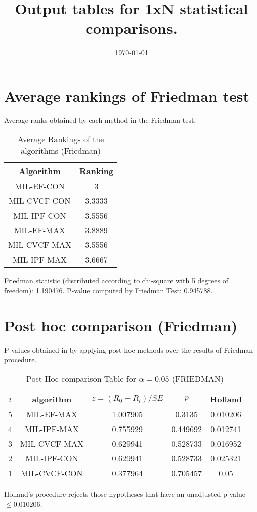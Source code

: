 \documentclass[a4paper,10pt]{article}
\title{Output tables for 1xN statistical comparisons.}
\author{}
\date{\today}
\begin{document}
\begin{landscape}
\pagestyle{empty}
\maketitle
\thispagestyle{empty}

\section{Average rankings of Friedman test}


Average ranks obtained by each method in the Friedman test.

\begin{table}[!htp]
\centering
\begin{tabular}{|c|c|}\hline
Algorithm&Ranking\\\hline
MIL-EF-CON&3\\MIL-CVCF-CON&3.3333\\MIL-IPF-CON&3.5556\\MIL-EF-MAX&3.8889\\MIL-CVCF-MAX&3.5556\\MIL-IPF-MAX&3.6667\\\hline\end{tabular}
\caption{Average Rankings of the algorithms (Friedman)}
\end{table}

Friedman statistic (distributed according to chi-square with 5 degrees of freedom): 1.190476. \newline P-value computed by Friedman Test: 0.945788.\newline


\newpage

\section{Post hoc comparison (Friedman)}


P-values obtained in by applying post hoc methods over the results of Friedman procedure.

\begin{table}[!htp]
\centering\footnotesize
\begin{tabular}{ccccc}
$i$&algorithm&$z=(R_0 - R_i)/SE$&$p$&Holland\\
\hline5&MIL-EF-MAX&1.007905&0.3135&0.010206\\4&MIL-IPF-MAX&0.755929&0.449692&0.012741\\3&MIL-CVCF-MAX&0.629941&0.528733&0.016952\\2&MIL-IPF-CON&0.629941&0.528733&0.025321\\1&MIL-CVCF-CON&0.377964&0.705457&0.05\\\hline
\end{tabular}
\caption{Post Hoc comparison Table for $\alpha=0.05$ (FRIEDMAN)}
\end{table}Holland's procedure rejects those hypotheses that have an unadjusted p-value $\le0.010206$.



\end{landscape}
\end{document}
